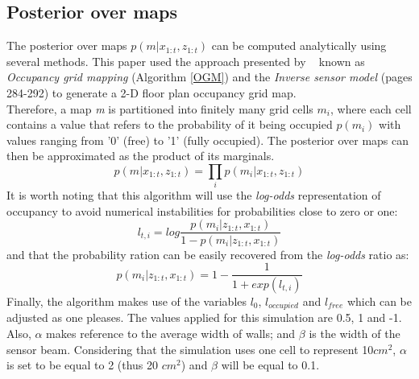 \documentclass[letterpaper]{article}
\begin{document}
\subsection{Posterior over maps}
The posterior over maps $p(m|x_{1:t},z_{1:t})$ can be computed analytically using several methods. This paper used the approach presented by ~\cite{ProbabilisticRobotics} known as \textit{Occupancy grid mapping} (Algorithm \ref{OGM}) and the \textit{Inverse sensor model} (pages 284-292) to generate a 2-D floor plan occupancy grid map.\\
Therefore, a map \textit{m} is partitioned into finitely many grid cells $m_i$, where each cell contains a value that refers to the probability of it being occupied $p(m_i)$ with values ranging from '0' (free) to '1' (fully occupied). The posterior over maps can then be approximated as the product of its marginals.
\begin{equation*} 
p(m|x_{1:t},z_{1:t}) = \prod_{i} p(m_i|x_{1:t},z_{1:t})
\end{equation*}
It is worth noting that this algorithm will use the \textit{log-odds} representation of occupancy to avoid numerical instabilities for probabilities close to zero or one:
\begin{equation*} 
l_{t,i}= log \frac{p(m_i | z_{1:t}, x_{1:t})}{1-p(m_i | z_{1:t}, x_{1:t})}
\end{equation*}
and that the probability ration can be easily recovered from the \textit{log-odds} ratio as:
\begin{equation*} 
p(m_i | z_{1:t}, x_{1:t})= 1- \frac{1}{1+exp(l_{t,i})}
\end{equation*}
Finally, the algorithm makes use of the variables $l_0$, $l_{occupied}$ and $l_{free}$ which can be adjusted as one pleases. The values applied for this simulation are 0.5, 1 and -1. Also, $\alpha$ makes reference to the average width of walls; and $\beta$ is the width of the sensor beam. Considering that the simulation uses one cell to represent 10$cm^2$, $\alpha$ is set to be equal to 2 (thus 20 $cm^2$) and $\beta$ will be equal to 0.1.
\end{document}
